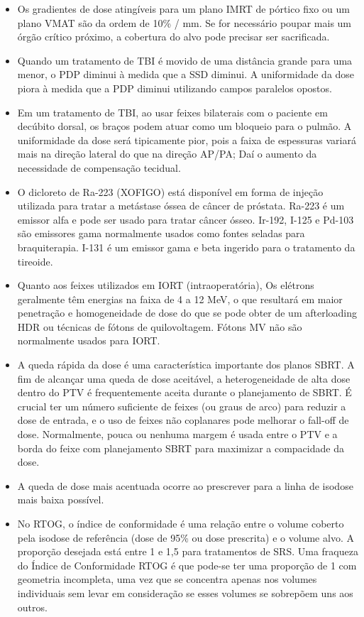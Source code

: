 \documentclass[11pt,a4paper]{article}
\newcounter{exemplo}
\begin{document}
\begin{exemplo}[Radioterapia]
\begin{itemize}
        \item Os gradientes de dose atingíveis para um plano IMRT de pórtico fixo ou um plano VMAT são da ordem de 10\% / mm. Se for necessário poupar mais um órgão crítico próximo, a cobertura do alvo pode precisar ser sacrificada.
        
        \item Quando um tratamento de TBI é movido de uma distância grande para uma menor, o PDP diminui à medida que a SSD diminui. A uniformidade da dose piora à medida que a PDP diminui utilizando campos paralelos opostos.
        
        \item Em um tratamento de TBI, ao usar feixes bilaterais com o paciente em decúbito dorsal, os braços podem atuar como um bloqueio para o pulmão. A uniformidade da dose será tipicamente pior, pois a faixa de espessuras variará mais na direção lateral do que na direção AP/PA; Daí o aumento da necessidade de compensação tecidual.
        
        \item O dicloreto de Ra-223 (XOFIGO) está disponível em forma de injeção utilizada para tratar a metástase óssea de câncer de próstata. Ra-223 é um emissor alfa e pode ser usado para tratar câncer ósseo. Ir-192, I-125 e Pd-103 são emissores gama normalmente usados como fontes seladas para braquiterapia. I-131 é um emissor gama e beta ingerido para o tratamento da tireoide.
        
        \item Quanto aos feixes utilizados em IORT (intraoperatória), Os elétrons geralmente têm energias na faixa de 4 a 12 MeV, o que resultará em maior penetração e homogeneidade de dose do que se pode obter de um afterloading HDR ou técnicas de fótons de quilovoltagem. Fótons MV não são normalmente usados para IORT.
        
        \item A queda rápida da dose é uma característica importante dos planos SBRT. A fim de alcançar uma queda de dose aceitável, a heterogeneidade de alta dose dentro do PTV é frequentemente aceita durante o planejamento de SBRT. É crucial ter um número suficiente de feixes (ou graus de arco) para reduzir a dose de entrada, e o uso de feixes não coplanares pode melhorar o fall-off de dose. Normalmente, pouca ou nenhuma margem é usada entre o PTV e a borda do feixe com planejamento SBRT para maximizar a compacidade da dose.
        
        \item A queda de dose mais acentuada ocorre ao prescrever para a linha de isodose mais baixa possível.
        \item No RTOG, o índice de conformidade é uma relação entre o volume coberto pela isodose de referência (dose de 95\% ou dose prescrita) e o volume alvo. A proporção desejada está entre 1 e 1,5 para tratamentos de SRS. Uma fraqueza do Índice de Conformidade RTOG é que pode-se ter uma proporção de 1 com geometria incompleta, uma vez que se concentra apenas nos volumes individuais sem levar em consideração se esses volumes se sobrepõem uns aos outros.
        

\end{itemize}
\end{exemplo}
\end{document}
